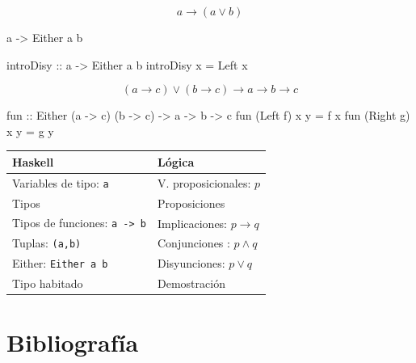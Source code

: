 \documentclass[aspectratio=169]{beamer}
\begin{document}
\begin{frame}[fragile]
  $$a \rightarrow (a \vee b)$$

  \pause

\begin{sesion}
a -> Either a b  
\end{sesion}

\pause

\begin{code}
introDisy :: a -> Either a b
introDisy x = Left x  
\end{code}
  
\end{frame}
\begin{frame}[fragile]
  $$(a\rightarrow c) \vee (b\rightarrow c) \rightarrow a \rightarrow b \rightarrow c  $$

  \pause
  
\begin{code}
fun :: Either (a -> c) (b -> c) -> a -> b -> c
fun (Left f)  x y = f x
fun (Right g) x y = g y
\end{code}
\end{frame}

\begin{frame}
\begin{table}[htbp]
\begin{center}
\begin{tabular}{|l|l|}
\hline
Haskell & Lógica \\
\hline \hline
Variables de tipo:  \texttt{a} & V. proposicionales: $p$  \\ \hline
Tipos & Proposiciones \\ \hline
Tipos de funciones: \texttt{a -> b} & Implicaciones: $p\rightarrow q$ \\ \hline
Tuplas: \texttt{(a,b)} & Conjunciones : $p\wedge q$ \\ \hline
Either: \texttt{Either a b} & Disyunciones: $p\vee q$ \\ \hline  
Tipo habitado & Demostración \\ \hline  
\end{tabular}
\end{center}
\end{table}
  

\end{frame}
\section{Bibliografía}
\begin{frame}[allowframebreaks]
\nocite{*} %
\small{
\vspace{0.75in}}
\end{frame}
\end{document}
